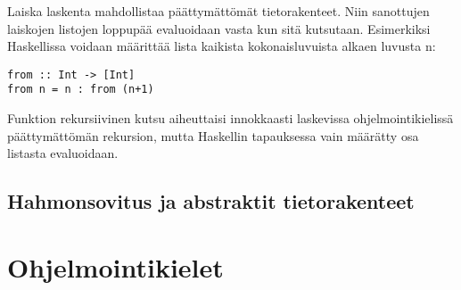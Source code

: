 Laiska laskenta mahdollistaa päättymättömät tietorakenteet. Niin sanottujen laiskojen listojen loppupää evaluoidaan
vasta kun sitä kutsutaan. Esimerkiksi Haskellissa voidaan määrittää lista kaikista kokonaisluvuista alkaen luvusta n:
\begin{verbatim}
from :: Int -> [Int]
from n = n : from (n+1)
\end{verbatim}
Funktion rekursiivinen kutsu aiheuttaisi innokkaasti laskevissa ohjelmointikielissä päättymättömän rekursion, mutta
Haskellin tapauksessa vain määrätty osa listasta evaluoidaan.\cite{languagedesign}


\subsection{Hahmonsovitus ja abstraktit tietorakenteet}


\section{Ohjelmointikielet}

